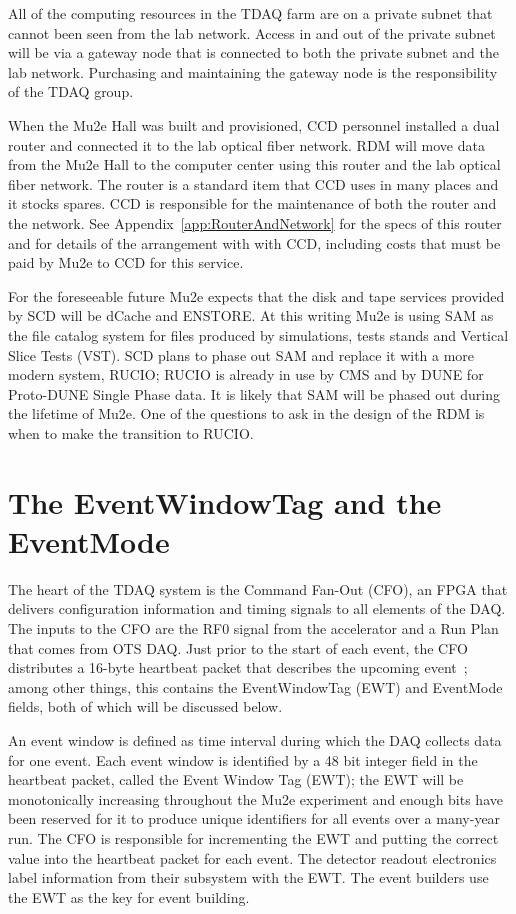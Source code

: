 All of the computing resources in the TDAQ farm are on a private subnet
that cannot been seen from the lab network.  Access in and out
of the private subnet will be via a gateway node that is connected to
both the private subnet and the lab network.
Purchasing and maintaining the gateway node is the responsibility of the TDAQ group.

When the Mu2e Hall was built and provisioned, CCD personnel installed a dual router
and connected it to the lab optical fiber network.
RDM will move data from the Mu2e Hall
to the computer center using this router and the lab optical fiber network.
The router is a standard item that CCD uses in many places and it stocks spares.
CCD is responsible for the maintenance of both the router and the network.
See Appendix~\ref{app:RouterAndNetwork} for the
specs of this router and for details of the arrangement with with CCD,
including costs that must be paid by Mu2e to CCD for this service.


For the foreseeable future Mu2e expects that the disk and tape services provided
by SCD will be dCache and ENSTORE.
At this writing Mu2e is using SAM as the file catalog system for files produced
by simulations, tests stands and Vertical Slice Tests (VST).
SCD plans to phase out SAM and replace it with a more modern system, RUCIO\cite{RUCIOHome};
RUCIO is already in use by CMS and by DUNE for Proto-DUNE Single Phase data.
It is likely that SAM will be phased out during the lifetime of Mu2e.
One of the questions to ask in the design of the RDM is
when to make the transition to RUCIO.

\section{The EventWindowTag and the EventMode}
\label{sec:EWTagAndEventMode}

The heart of the TDAQ system is the Command Fan-Out (CFO), an FPGA that delivers
configuration information and timing signals to all elements of the DAQ.
The inputs to the CFO are the RF0 signal from the accelerator
and a Run Plan that comes from OTS DAQ.
Just prior to the start of each event,
the CFO distributes a 16-byte heartbeat packet that describes the upcoming event~\cite{PacketProtocols};
among other things, this contains the EventWindowTag (EWT) and EventMode fields,
both of which will be discussed below.

An event window is defined as time interval during which the DAQ collects data for one event.
Each event window is identified by a 48 bit integer field in the heartbeat packet, called
the Event Window Tag (EWT);
the EWT will be monotonically increasing throughout the Mu2e experiment and
enough bits have been reserved for it to produce unique identifiers for all
events over a many-year run.
The CFO is responsible for incrementing the EWT and putting the correct value into
the heartbeat packet for each event.
The detector readout electronics label information from their subsystem with the EWT.
The event builders use the EWT as the key for event building.

